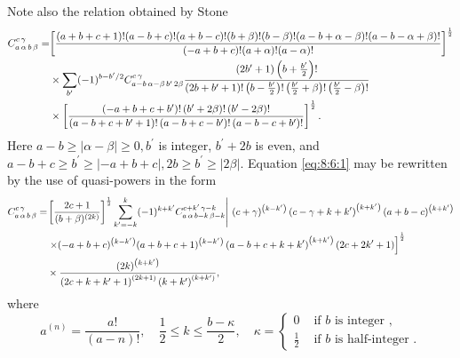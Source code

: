 Note also the relation obtained by Stone \cite{ref107}
\begin{align}
C_{a\,\alpha\,b\,\beta}^{c\,\gamma}= & {\left[\frac{(a+b+c+1)!(a-b+c)!(a+b-c)!(b+\beta)!(b-\beta)!(a-b+\alpha-\beta)!(a-b-\alpha+\beta)!}{(-a+b+c)!(a+\alpha)!(a-\alpha)!}\right]^{\frac{1}{2}} }  \notag\\
& \times \sum_{b^{\prime}}(-1)^{b-b^{\prime} / 2} 
C_{a-b\,\alpha-\beta\,b^{\prime}\,2 \beta}^{c\,\gamma} \frac{\left(2 b^{\prime}+1\right)\left(b+\frac{b^{\prime}}{2}\right)!}{\left(2 b+b^{\prime}+1\right)!\left(b-\frac{b^{\prime}}{2}\right)!\left(\frac{b^{\prime}}{2}+\beta\right)!\left(\frac{b^{\prime}}{2}-\beta\right)!}  \notag\\
& \times\left[\frac{\left(-a+b+c+b^{\prime}\right)!\left(b^{\prime}+2 \beta\right)!\left(b^{\prime}-2 \beta\right)!}{\left(a-b+c+b^{\prime}+1\right)!\left(a-b+c-b^{\prime}\right)!\left(a-b-c+b^{\prime}\right)!}\right]^{\frac{1}{2}}. \label{eq:8:6:2}
\end{align}
Here $a-b \geq|\alpha-\beta| \geq 0, b^{\prime}$ is integer, $b^{\prime}+2 b$ is even, and $a-b+c \geq b^{\prime} \geq|-a+b+c|, 2 b \geq b^{\prime} \geq|2 \beta|$.
Equation \eqref{eq:8:6:1} may be rewritten by the use of quasi-powers in the form \cite{ref045}
\begin{align}
C_{a\,\alpha\,b\,\beta}^{c\,\gamma}= & { \left.\left[\frac{2 c+1}{(b+\beta)^{(2 k)}}\right]^{\frac{1}{2}} \sum_{k^{\prime}=-k}^{k}(-1)^{k+k^{\prime}} C_{a\,\alpha\,b-k\,\beta-k}^{c+k^{\prime}\,\gamma-k} \right\rvert\,(c+\gamma)^{\left(k-k^{\prime}\right)}\left(c-\gamma+k+k^{\prime}\right)^{\left(k+k^{\prime}\right)}(a+b-c)^{\left(k+k^{\prime}\right)} }  \notag\\
& \left.\times(-a+b+c)^{\left(k-k^{\prime}\right)}(a+b+c+1)^{\left(k-k^{\prime}\right)}\left(a-b+c+k+k^{\prime}\right)^{\left(k+k^{\prime}\right)}\left(2 c+2 k^{\prime}+1\right)\right]^{\frac{1}{2}}  \notag\\
& \times \frac{(2 k)^{\left(k+k^{\prime}\right)}}{\left(2 c+k+k^{\prime}+1\right)^{(2 k+1)}\left(k+k^{\prime}\right)^{\left(k+k^{\prime}\right)}}, \label{eq:8:6:3}
\end{align}
where
\[
a^{(n)}=\frac{a!}{(a-n)!}, \quad \frac{1}{2} \leq k \leq \frac{b-\kappa}{2}, \quad \kappa= \begin{cases}0 & \text { if } b \text { is integer }, \\ \frac{1}{2} & \text { if } b \text { is half-integer } .\end{cases}
\]
